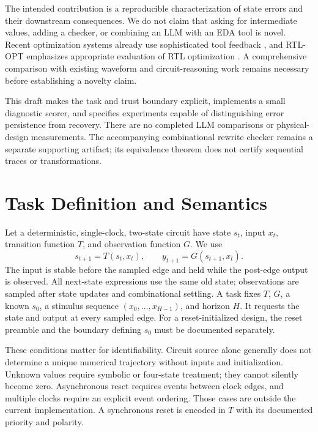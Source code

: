 \documentclass[conference,10pt]{IEEEtran}
\begin{document}
The intended contribution is a reproducible characterization of state errors and their downstream consequences. We do not claim that asking for intermediate values, adding a checker, or combining an LLM with an EDA tool is novel. Recent optimization systems already use sophisticated tool feedback \cite{ares,drrtl}, and RTL-OPT emphasizes appropriate evaluation of RTL optimization \cite{rtlopt}. A comprehensive comparison with existing waveform and circuit-reasoning work remains necessary before establishing a novelty claim.

This draft makes the task and trust boundary explicit, implements a small diagnostic scorer, and specifies experiments capable of distinguishing error persistence from recovery. There are no completed LLM comparisons or physical-design measurements. The accompanying combinational rewrite checker remains a separate supporting artifact; its equivalence theorem does not certify sequential traces or transformations.

\section{Task Definition and Semantics}
Let a deterministic, single-clock, two-state circuit have state $s_t$, input $x_t$, transition function $T$, and observation function $G$. We use
\begin{equation}
s_{t+1}=T(s_t,x_t),\qquad y_{t+1}=G(s_{t+1},x_t).
\end{equation}
The input is stable before the sampled edge and held while the post-edge output is observed. All next-state expressions use the same old state; observations are sampled after state updates and combinational settling. A task fixes $T$, $G$, a known $s_0$, a stimulus sequence $(x_0,\ldots,x_{H-1})$, and horizon $H$. It requests the state and output at every sampled edge. For a reset-initialized design, the reset preamble and the boundary defining $s_0$ must be documented separately.

These conditions matter for identifiability. Circuit source alone generally does not determine a unique numerical trajectory without inputs and initialization. Unknown values require symbolic or four-state treatment; they cannot silently become zero. Asynchronous reset requires events between clock edges, and multiple clocks require an explicit event ordering. Those cases are outside the current implementation. A synchronous reset is encoded in $T$ with its documented priority and polarity.
\end{document}
